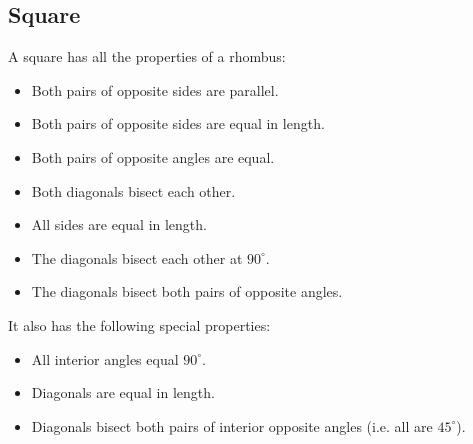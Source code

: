 \subsection{Square}
A square has all the properties of a rhombus:
\begin{itemize}[noitemsep]
\item Both pairs of opposite sides are parallel.
\item Both pairs of opposite sides are equal in length.
\item Both pairs of opposite angles are equal.
\item Both diagonals bisect each other.
\item All sides are equal in length.
\item The diagonals bisect each other at ${90}^{\circ}$.
\item The diagonals bisect both pairs of opposite angles.
\end{itemize}

It also has the following special properties:
\begin{itemize}[noitemsep]
\item All interior angles equal ${90}^{\circ}$.
\item Diagonals are equal in length.
\item Diagonals bisect both pairs of interior opposite angles (i.e.\@{} all are ${45}^{\circ}$).
\end{itemize}

